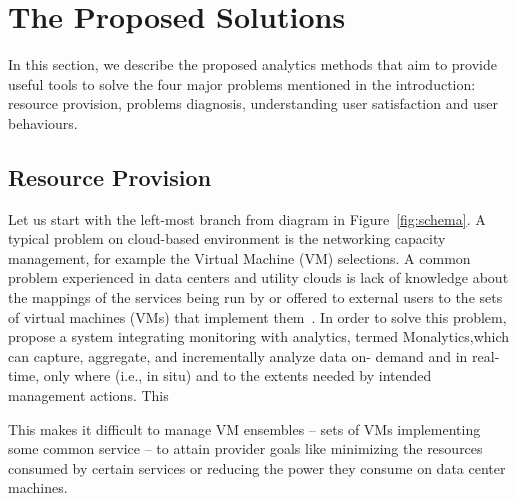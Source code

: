 \section{The Proposed Solutions}
In this section, we describe the proposed analytics methods that aim to provide useful tools to solve the four major problems mentioned in the introduction: resource provision, problems diagnosis, understanding user satisfaction and user behaviours.

\subsection{Resource Provision}
Let us start with the left-most branch from diagram in Figure~\ref{fig:schema}. A typical problem on cloud-based environment is the networking capacity management, for example the Virtual Machine (VM) selections. A common problem experienced in data centers and utility clouds is lack of knowledge about the mappings of the services being run by or offered to external users to the sets of virtual machines (VMs) that implement them~\cite{Wang2011}. In order to solve this problem,  propose a system integrating monitoring with analytics, termed Monalytics,which can capture, aggregate, and incrementally analyze data on- demand and in real-time, only where (i.e., in situ) and to the extents needed by intended management actions. This



This makes it difficult to manage VM ensembles – sets of VMs implementing some common service – to attain provider goals like minimizing the resources consumed by certain services or reducing the power they consume on data center machines. %

